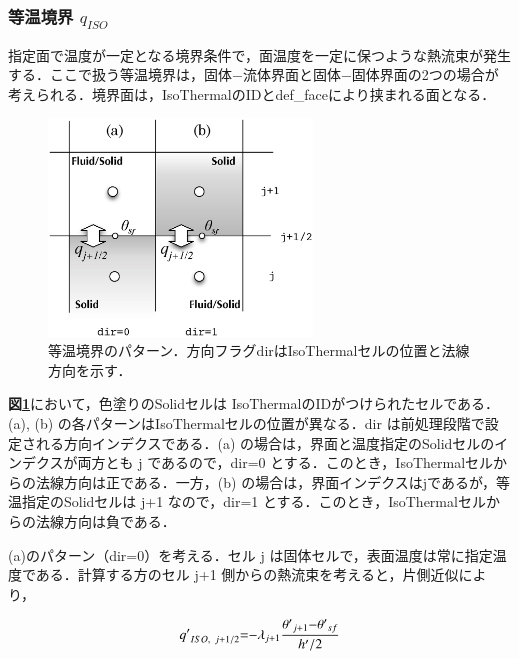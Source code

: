 %
\subsubsection{等温境界 $q_{ISO}$}
指定面で温度が一定となる境界条件で，面温度を一定に保つような熱流束が発生する．ここで扱う等温境界は，固体−流体界面と固体−固体界面の2つの場合が考えられる．境界面は，IsoThermalのIDとdef\_faceにより挟まれる面となる．

\begin{figure}[htdp]
\begin{center}
\includegraphics[width=7cm,clip]{Isothermal.eps}
\caption{等温境界のパターン．方向フラグdirはIsoThermalセルの位置と法線方向を示す．}
\label{fig:iso-thermal}
\end{center}
\end{figure}

\noindent \textbf{図\ref{fig:iso-thermal}}において，色塗りのSolidセルは IsoThermalのIDがつけられたセルである．(a), (b) の各パターンはIsoThermalセルの位置が異なる．dir は前処理段階で設定される方向インデクスである．(a) の場合は，界面と温度指定のSolidセルのインデクスが両方とも j であるので，dir=0 とする．このとき，IsoThermalセルからの法線方向は正である．一方，(b) の場合は，界面インデクスはjであるが，等温指定のSolidセルは j+1 なので，dir=1 とする．このとき，IsoThermalセルからの法線方向は負である．

(a)のパターン（dir=0）を考える．セル j は固体セルで，表面温度は常に指定温度である．計算する方のセル j+1 側からの熱流束を考えると，片側近似により，

\begin{equation}
{{q}'}_{{ISO}{\mathrm{,}}\hspace{0.33em}{j}\mathrm{{+}}{1}{\mathrm{/}}{2}}\mathrm{{=}}\mathrm{{-}}{{\mathit{\lambda}}}_{{j}\mathrm{{+}}{1}}\frac{{{\mathit{\theta}}'}_{{j}\mathrm{{+}}{1}}\mathrm{{-}}{{\mathit{\theta}}'}_{sf}}{{{h}'}\slash{2}}
\label{eq:qiso1}
\end{equation}

